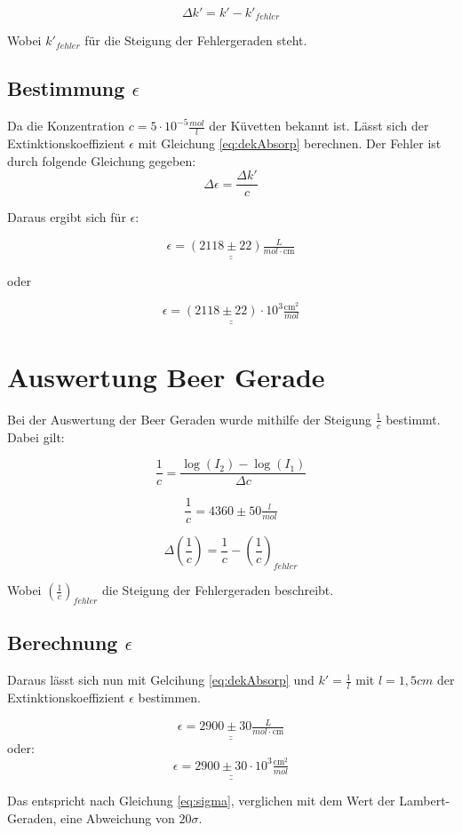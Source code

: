 \begin{equation}
    \Delta k' = k' - k'_{fehler}
\end{equation}

Wobei $k'_{fehler}$ für die Steigung der Fehlergeraden steht.

\subsection{Bestimmung $\epsilon$}

Da die Konzentration $c = 5 \cdot 10^{-5} \tfrac{mol}{l}$ der Küvetten bekannt ist.
Lässt sich der Extinktionskoeffizient $\epsilon$ mit Gleichung \ref{eq:dekAbsorp} berechnen. Der Fehler ist durch folgende Gleichung gegeben:
\begin{equation}
    \Delta \epsilon = \frac{\Delta k'}{c}
\end{equation}

Daraus ergibt sich für $\epsilon$:

\[ \underline{\underline{\epsilon = (2118 \pm 22) \tfrac{L}{mol \cdot \text{cm}}}}\]

oder


\[ \underline{\underline{\epsilon =( 2118 \pm 22) \cdot 10^3\tfrac{\text{cm}^2}{mol}}}\]

\section{Auswertung Beer Gerade}

Bei der Auswertung der Beer Geraden wurde mithilfe der Steigung $\frac{1}{c}$
bestimmt. Dabei gilt:

\begin{equation}
    \frac{1}{c} = \frac{\log(I_2)-\log(I_1)}{\Delta c}
\end{equation}

\[ \frac{1}{c} = 4360 \pm 50 \tfrac{l}{mol}\]

\begin{equation}
    \Delta(\frac{1}{c}) = \frac{1}{c} - (\frac{1}{c})_{fehler}
\end{equation}

Wobei $(\frac{1}{c})_{fehler}$ die Steigung der Fehlergeraden beschreibt.

\subsection{Berechnung $\epsilon$}

Daraus lässt sich nun mit Gelcihung \ref{eq:dekAbsorp} und $k' = \frac{1}{l}$ mit $l = 1,5 cm$
der Extinktionskoeffizient $\epsilon$ bestimmen.

\[ \underline{\underline{\epsilon = 2900 \pm 30 \tfrac{L}{mol \cdot \text{cm}}}}\]
oder:
\[ \underline{\underline{\epsilon = 2900 \pm 30 \cdot 10^3\tfrac{\text{cm}^2}{mol}}}\]

Das entspricht nach Gleichung \ref{eq:sigma}, verglichen mit dem Wert der Lambert-Geraden, eine Abweichung von $20 \sigma$.

